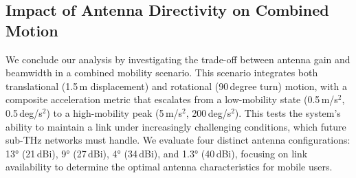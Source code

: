 \documentclass[fleqn,10pt]{wlscirep}
\begin{document}
\subsection*{Impact of Antenna Directivity on Combined Motion}

We conclude our analysis by investigating the trade-off between antenna gain and beamwidth in a combined mobility scenario. This scenario integrates both translational (1.5\,m displacement) and rotational (90\,degree turn) motion, with a composite acceleration metric that escalates from a low-mobility state (0.5\,m/s$^2$, 0.5\,deg/s$^2$) to a high-mobility peak (5\,m/s$^2$, 200\,deg/s$^2$). This tests the system's ability to maintain a link under increasingly challenging conditions, which future sub-THz networks must handle. We evaluate four distinct antenna configurations: 13° (21\,dBi), 9° (27\,dBi), 4° (34\,dBi), and 1.3° (40\,dBi), focusing on link availability to determine the optimal antenna characteristics for mobile users.
\end{document}
